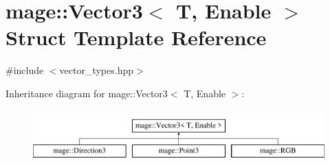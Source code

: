\hypertarget{structmage_1_1_vector3}{}\section{mage\+:\+:Vector3$<$ T, Enable $>$ Struct Template Reference}
\label{structmage_1_1_vector3}


{\ttfamily \#include $<$vector\+\_\+types.\+hpp$>$}

Inheritance diagram for mage\+:\+:Vector3$<$ T, Enable $>$\+:\begin{figure}[H]
\begin{center}
\leavevmode
\includegraphics[height=2.000000cm]{structmage_1_1_vector3}
\end{center}
\end{figure}
